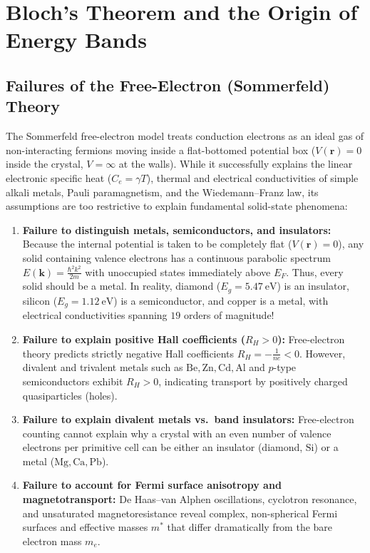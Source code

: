 \documentclass[11pt,a4paper]{article}
\newcommand{\hb}{\hbar}
\newcommand{\hbarsq}{\hb^2}
\newcommand{\kk}{\mathbf{k}}
\newcommand{\rvec}{\mathbf{r}}
\begin{document}
\section{Bloch's Theorem and the Origin of Energy Bands}
\label{sec:bloch}

\subsection{Failures of the Free-Electron (Sommerfeld) Theory}
The Sommerfeld free-electron model treats conduction electrons as an ideal gas of non-interacting fermions moving inside a flat-bottomed potential box ($V(\rvec) = 0$ inside the crystal, $V = \infty$ at the walls). While it successfully explains the linear electronic specific heat ($C_e = \gamma T$), thermal and electrical conductivities of simple alkali metals, Pauli paramagnetism, and the Wiedemann--Franz law, its assumptions are too restrictive to explain fundamental solid-state phenomena:
\begin{enumerate}
    \item \textbf{Failure to distinguish metals, semiconductors, and insulators:} Because the internal potential is taken to be completely flat ($V(\rvec)=0$), any solid containing valence electrons has a continuous parabolic spectrum $E(\kk) = \frac{\hbarsq k^2}{2m}$ with unoccupied states immediately above $E_F$. Thus, every solid should be a metal. In reality, diamond ($E_g = 5.47\ \mathrm{eV}$) is an insulator, silicon ($E_g = 1.12\ \mathrm{eV}$) is a semiconductor, and copper is a metal, with electrical conductivities spanning $19$ orders of magnitude!
    \item \textbf{Failure to explain positive Hall coefficients ($R_H > 0$):} Free-electron theory predicts strictly negative Hall coefficients $R_H = -\frac{1}{ne} < 0$. However, divalent and trivalent metals such as $\text{Be}, \text{Zn}, \text{Cd}, \text{Al}$ and $p$-type semiconductors exhibit $R_H > 0$, indicating transport by positively charged quasiparticles (holes).
    \item \textbf{Failure to explain divalent metals vs.\ band insulators:} Free-electron counting cannot explain why a crystal with an even number of valence electrons per primitive cell can be either an insulator (diamond, $\text{Si}$) or a metal ($\text{Mg}, \text{Ca}, \text{Pb}$).
    \item \textbf{Failure to account for Fermi surface anisotropy and magnetotransport:} De Haas--van Alphen oscillations, cyclotron resonance, and unsaturated magnetoresistance reveal complex, non-spherical Fermi surfaces and effective masses $m^*$ that differ dramatically from the bare electron mass $m_e$.
\end{enumerate}
\end{document}
